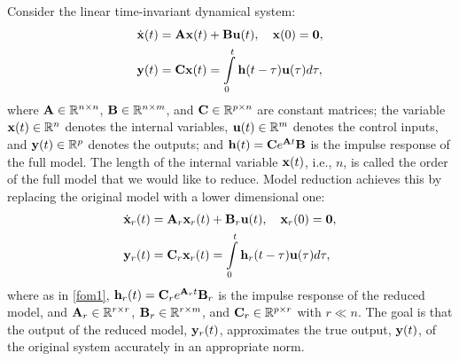 \documentclass[twocolumn]{autart}
\begin{document}
Consider the linear time-invariant dynamical system:
\begin{equation}  \label{fom1}
\begin{aligned}
\dot{\x}(t) & = \A\x(t) +\B\uu(t),~~~\x(0) = \mathbf{0},\\
\y(t)&= \C\x(t)  = \int_{0}^{t}\h (t-\tau)\uu(\tau) d\tau,
\end{aligned}
\end{equation}
\noindent
where %
$ \mathbf{A} \in \mathbb{R}^{n\times n}$,
 $\mathbf{B}\in \mathbb{R}^{n\times m}$, and $\mathbf{C}\in \mathbb{R}^{p\times n}$ are constant matrices; 
the variable $\mathbf{x}(t)\in \mathbb{R}^n$ denotes the internal variables, $\mathbf{u}(t)\in \mathbb{R}^m$ denotes the control inputs, and $\mathbf{y}(t)\in \mathbb{R}^p$ denotes the outputs; and $\mathbf{h}(t)=\mathbf{C} e^{\mathbf{A} t}\mathbf{B}$ is the impulse response of the full model.   The length of the internal variable $\mathbf{x}(t)$, i.e., $n$, is called the order of the full model that we would like to reduce.  Model
reduction achieves this by replacing the original model with a lower dimensional one:
\begin{equation}  \label{rom1}
\begin{aligned}
\dot{\x}_r(t)&=\A_r\x_r(t)+\B_r\uu(t),~~~\x_r(0) = \mathbf{0},\\
\y_r(t)&=\C_r\x_r(t)  = \int_{0}^{t}\h_r (t-\tau)\uu(\tau)d\tau,
\end{aligned}
\end{equation}
where as in \eqref{fom1}, %
$\mathbf{h}_r(t)=\mathbf{C}_r e^{\mathbf{A}_r t}\mathbf{B}_r$  is the impulse response of the reduced model, and $\mathbf{A}_r \in \mathbb{R}^{r\times r}$, $\mathbf{B}_r\in \mathbb{R}^{r\times m}$, and $\mathbf{C}_r\in \mathbb{R}^{p\times r}$ with $r\ll n$. The goal is that the output of the reduced model, $\mathbf{y}_r(t)$, approximates the true output, $\mathbf{y}(t)$, of the original system accurately in an appropriate norm. 
\end{document}
